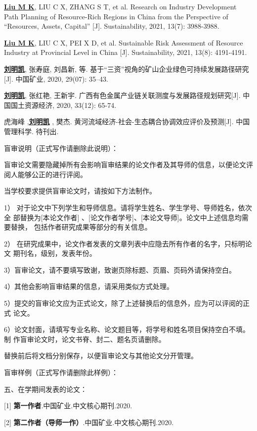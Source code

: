 \begin{enumerate}[label={[\arabic*]}, ,itemindent=*,leftmargin=*] 
\item	\uline{\textbf{Liu M K}}, LIU C X, ZHANG S T, et al. Research on Industry Development Path Planning of Resource-Rich Regions in China from the Perspective of “Resources, Assets, Capital” [J]. Sustainability, 2021, 13(7): 3988-3988.

\item	\uline{\textbf{Liu M K}}, LIU C X, PEI X D, et al.   Sustainable Risk Assessment of Resource Industry at Provincial Level in China [J]. Sustainability, 2021, 13(8): 4191-4191.

\item \uline{\textbf{刘}}\uline{\textbf{明}}\uline{\textbf{凯}}, 张寿庭, 刘昌新, 等. 基于“三资”视角的矿山企业绿色可持续发展路径研究[J]. 中国矿业, 2020, 29(07): 35–43.

\item \uline{\textbf{刘}}\uline{\textbf{明}}\uline{\textbf{凯}}, 张红艳, 王新宇. 广西有色金属产业链关联测度与发展路径规划研究[J]. 中国国土资源经济, 2020, 33(12): 65-74.

\item	虎海峰 ,\uline{\textbf{刘}}\uline{\textbf{明}}\uline{\textbf{凯}} , 樊杰. 黄河流域经济-社会-生态耦合协调效应评价及预测[J]. 中国管理科学. 待刊出.
\end{enumerate}

{\color{blue} 盲审说明（正式写作请删除此说明）：}

盲审论文需要隐藏掉所有会影响盲审结果的论文作者及其导师的信息，以便论文评
阅人能够公正的进行评阅。

当学校要求提供盲审论文时，请按如下方法制作。

1） 对于论文中下列学生和导师信息。请将学生姓名、学生学号、导师姓名，依次全
部替换为[本论文作者] 、[论文作者学号]、[本论文导师]。论文中上述信息均需要替换，
包括作者研究成果等部分的有关信息。

2） 在研究成果中，论文作者发表的文章列表中应隐去所有作者的名字，只标明论文
期刊名，级别，发表年份。

3）盲审论文，请不要填写致谢，致谢页除标题、页眉、页码外请保持空白。

4）其他会影响盲审结果的信息，请采用类似方式处理。

5）提交的盲审论文应为正式论文，除了上述替换后的信息外，应为可以评阅的正式
论文。

6）论文封面，请填写专业名称、论文题目等，将学号和姓名项目保持空白不填。制
作盲审论文时，论文书脊、封二、题名页请删除。

替换前后将文档分别保存，以便盲审论文与其他论文分开管理。

{\color{blue} 盲审样例（正式写作请删除此样例）：}

五、在学期间发表的论文：


[1] \textbf{第一作者}.中国矿业.中文核心期刊.2020.

[2] \textbf{第二作者（导师一作）}.中国矿业.中文核心期刊.2020.


